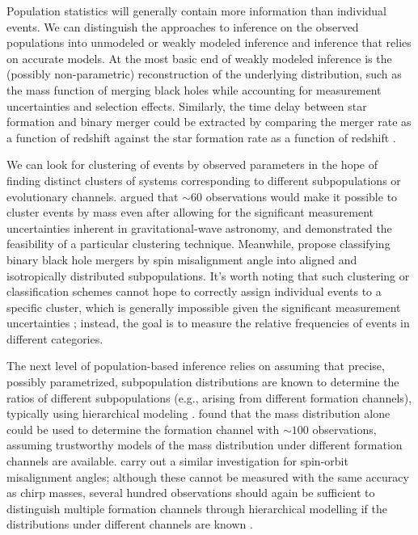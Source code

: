 \documentclass[iop,onecolumn]{revtex4}
\begin{document}
Population statistics will generally contain more information than individual events.  We can distinguish the approaches to inference on the observed populations into unmodeled or weakly modeled inference and inference that relies on accurate models. At the most basic end of weakly modeled inference is the (possibly non-parametric) reconstruction of the underlying distribution, such as the mass function of merging black holes \citep{Mandel:2010,O1:BBH} while accounting for measurement uncertainties and selection effects.  Similarly, the time delay between star formation and binary merger could be extracted by comparing the merger rate as a function of redshift against the star formation rate as a function of redshift \citep{Mandel:2016select}.

We can look for clustering of events by observed parameters in the hope of finding distinct clusters of systems corresponding to different subpopulations or evolutionary channels.  \citet{Mandel:2015} argued that $\sim 60$ observations would make it possible to cluster events by mass even after allowing for the significant measurement uncertainties inherent in gravitational-wave astronomy, and \citet{Mandel:2016cluster} demonstrated the feasibility of a particular clustering technique.  Meanwhile, \citet{Farr:2018} propose classifying binary black hole mergers by spin misalignment angle into aligned and isotropically distributed subpopulations.  It's worth noting that such clustering or classification schemes cannot hope to correctly assign individual events to a specific cluster, which is generally impossible given the significant measurement uncertainties \citep{Littenberg:2015}; instead, the goal is to measure the relative frequencies of events in different categories.

The next level of population-based inference relies on assuming that precise, possibly parametrized, subpopulation distributions are known to determine the ratios of different subpopulations (e.g., arising from different formation channels), typically using hierarchical modeling \citep[extreme deconvolution in the language of][]{Hogg:2011}.  \citet{Zevin:2017} found that the mass distribution alone could be used to determine the formation channel with $\sim 100$ observations, assuming trustworthy models of the mass distribution under different formation channels are available.  \citet{Vitale:2015,Stevenson:2017spin} carry out a similar investigation for spin-orbit misalignment angles; although these cannot be measured with the same accuracy as chirp masses, several hundred observations should again be sufficient to distinguish multiple formation channels through hierarchical modelling if the distributions under different channels are known \citep{Stevenson:2017spin}.   
\end{document}
